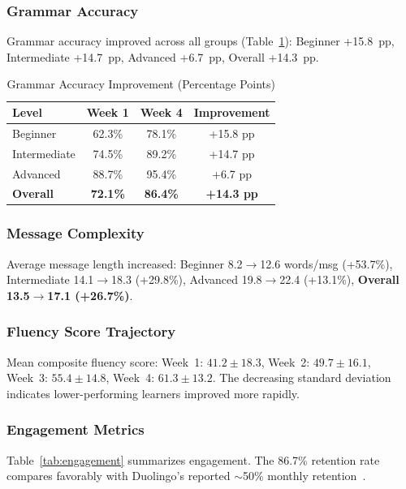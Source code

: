 \documentclass[conference]{IEEEtran}
\begin{document}
\subsubsection{Grammar Accuracy}
Grammar accuracy improved across all groups (Table~\ref{tab:grammar}): Beginner +15.8~pp, Intermediate +14.7~pp, Advanced +6.7~pp, Overall +14.3~pp.

\begin{table}[htbp]
\caption{Grammar Accuracy Improvement (Percentage Points)}
\label{tab:grammar}
\centering
\begin{tabular}{@{}lccc@{}}
\toprule
\textbf{Level} & \textbf{Week 1} & \textbf{Week 4} & \textbf{Improvement} \\
\midrule
Beginner & 62.3\% & 78.1\% & +15.8 pp \\
Intermediate & 74.5\% & 89.2\% & +14.7 pp \\
Advanced & 88.7\% & 95.4\% & +6.7 pp \\
\textbf{Overall} & \textbf{72.1\%} & \textbf{86.4\%} & \textbf{+14.3 pp} \\
\bottomrule
\end{tabular}
\end{table}

\subsubsection{Message Complexity}
Average message length increased: Beginner 8.2$\rightarrow$12.6 words/msg (+53.7\%), Intermediate 14.1$\rightarrow$18.3 (+29.8\%), Advanced 19.8$\rightarrow$22.4 (+13.1\%), \textbf{Overall 13.5$\rightarrow$17.1 (+26.7\%)}.

\subsubsection{Fluency Score Trajectory}
Mean composite fluency score: Week~1: $41.2 \pm 18.3$, Week~2: $49.7 \pm 16.1$, Week~3: $55.4 \pm 14.8$, Week~4: $61.3 \pm 13.2$. The decreasing standard deviation indicates lower-performing learners improved more rapidly.

\subsubsection{Engagement Metrics}
Table~\ref{tab:engagement} summarizes engagement. The 86.7\% retention rate compares favorably with Duolingo's reported $\sim$50\% monthly retention~\cite{statista2024}.
\end{document}
